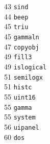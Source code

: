 \begin{footnotesize}
\begin{multicols}{3}
\vspace{-.153cm} 43    \hspace{.2cm} {\tt sind                }    \\ %
\vspace{-.153cm} 44    \hspace{.2cm} {\tt beep                }    \\ %
\vspace{-.153cm} 45    \hspace{.2cm} {\tt triu                }    \\ %
\vspace{-.153cm} 45    \hspace{.2cm} {\tt gammaln             }    \\ %
\vspace{-.153cm} 47    \hspace{.2cm} {\tt copyobj             }    \\ %
\vspace{-.153cm} 49    \hspace{.2cm} {\tt fill3               }    \\ %
\vspace{-.153cm} 49    \hspace{.2cm} {\tt islogical           }    \\ %
\vspace{-.153cm} 51    \hspace{.2cm} {\tt semilogx            }    \\ %
\vspace{-.153cm} 51    \hspace{.2cm} {\tt histc               }    \\ %
\vspace{-.153cm} 55    \hspace{.2cm} {\tt uint16              }    \\ %
\vspace{-.153cm} 55    \hspace{.2cm} {\tt gamma               }    \\ %
\vspace{-.153cm} 55    \hspace{.2cm} {\tt system              }    \\ %
\vspace{-.153cm} 56    \hspace{.2cm} {\tt uipanel             }    \\ %
\vspace{-.153cm} 60    \hspace{.2cm} {\tt dos                 }    \\ %

\end{multicols}
\end{footnotesize}
